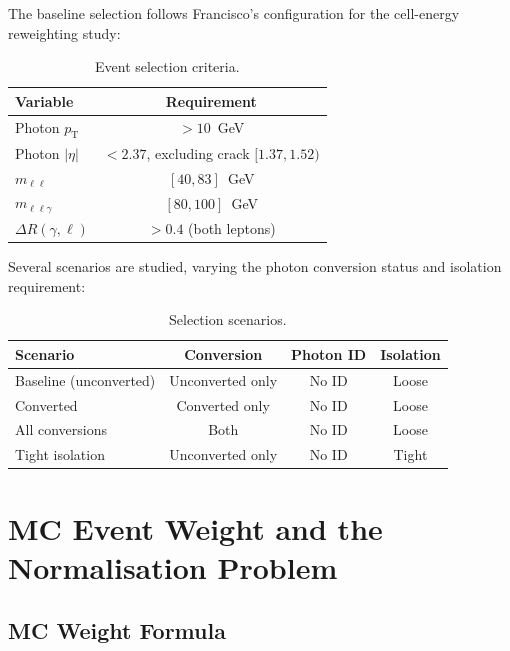 \documentclass[11pt,a4paper]{article}
\newcommand{\pT}{\ensuremath{p_{\mathrm{T}}}\xspace}
\begin{document}
The baseline selection follows Francisco's configuration for the cell-energy
reweighting study:

\begin{table}[H]
\centering
\caption{Event selection criteria.}
\label{tab:selection}
\begin{tabular}{lc}
\toprule
Variable & Requirement \\
\midrule
Photon $\pT$ & $> 10$~GeV \\
Photon $|\eta|$ & $< 2.37$, excluding crack $[1.37, 1.52)$ \\
$m_{\ell\ell}$ & $[40, 83]$~GeV \\
$m_{\ell\ell\gamma}$ & $[80, 100]$~GeV \\
$\Delta R(\gamma, \ell)$ & $> 0.4$ (both leptons) \\
\bottomrule
\end{tabular}
\end{table}

Several scenarios are studied, varying the photon conversion status and
isolation requirement:

\begin{table}[H]
\centering
\caption{Selection scenarios.}
\label{tab:scenarios}
\begin{tabular}{lccc}
\toprule
Scenario & Conversion & Photon ID & Isolation \\
\midrule
Baseline (unconverted) & Unconverted only & No ID & Loose \\
Converted              & Converted only   & No ID & Loose \\
All conversions        & Both             & No ID & Loose \\
Tight isolation        & Unconverted only & No ID & Tight \\
\bottomrule
\end{tabular}
\end{table}

\section{MC Event Weight and the Normalisation Problem}
\label{sec:normalisation}

\subsection{MC Weight Formula}
\end{document}
